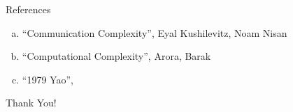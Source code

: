 \documentclass[9pt]{beamer}
\begin{document}
\begin{frame}{References}
  \begin{enumerate}[a.]
  \item ``Communication Complexity'', Eyal Kushilevitz, Noam Nisan
  \item ``Computational Complexity'', Arora, Barak
  \item ``1979 Yao'', 
  \end{enumerate}
\end{frame}
\begin{frame}
  \begin{center}
    \Huge Thank You!
  \end{center}
  
\end{frame}
\end{document}
